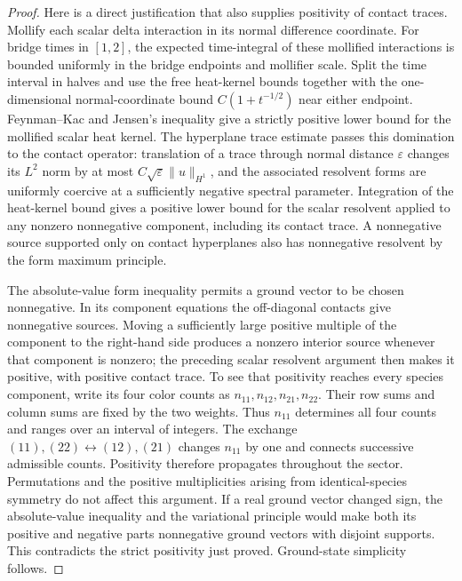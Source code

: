 \begin{proof}
Here is a direct justification that also supplies positivity of contact
traces.  Mollify each scalar delta interaction in its normal difference
coordinate.  For bridge times in $[1,2]$, the expected time-integral of
these mollified interactions is bounded uniformly in the bridge endpoints
and mollifier scale.  Split the time interval in halves and use the free
heat-kernel bounds together with the one-dimensional normal-coordinate
bound $C(1+t^{-1/2})$ near either endpoint.  Feynman--Kac and Jensen's
inequality give a strictly positive lower bound for the mollified scalar
heat kernel.  The hyperplane trace estimate passes this domination to the
contact operator: translation of a trace through normal distance
$\varepsilon$ changes its $L^2$ norm by at most
$C\sqrt\varepsilon\|u\|_{H^1}$, and the associated resolvent forms are
uniformly coercive at a sufficiently negative spectral parameter.
Integration of the heat-kernel bound gives a positive lower bound for the
scalar resolvent applied to any nonzero nonnegative component, including
its contact trace.  A nonnegative source supported only on contact
hyperplanes also has nonnegative resolvent by the form maximum principle.

The absolute-value form inequality permits a ground vector to be chosen
nonnegative.  In its component equations the off-diagonal contacts give
nonnegative sources.  Moving a sufficiently large positive multiple of
the component to the right-hand side produces a nonzero interior source
whenever that component is nonzero; the preceding scalar resolvent
argument then makes it positive, with positive contact trace.  To see that
positivity reaches every species component, write its four
color counts as $n_{11},n_{12},n_{21},n_{22}$.  Their row sums and column
sums are fixed by the two weights.  Thus $n_{11}$ determines all four
counts and ranges over an interval of integers.  The exchange
$(11),(22)\leftrightarrow(12),(21)$ changes $n_{11}$ by one and connects
successive admissible counts.  Positivity therefore propagates throughout
the sector.  Permutations and the positive multiplicities
arising from identical-species symmetry do not affect this argument.
If a real ground vector changed sign, the absolute-value inequality and
the variational principle would make both its positive and negative
parts nonnegative ground vectors with disjoint supports.  This contradicts
the strict positivity just proved.  Ground-state simplicity follows.


\end{proof}
